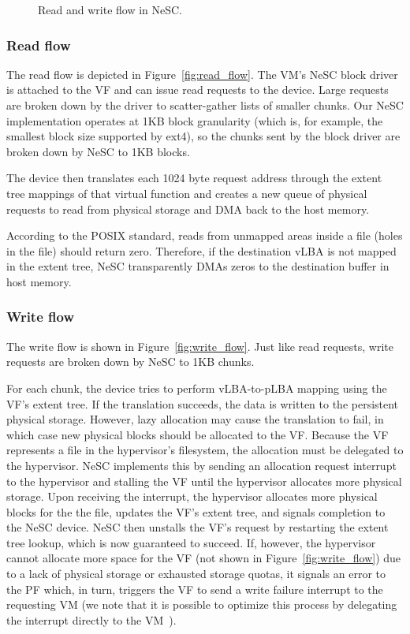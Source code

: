 \begin{figure}[t]
{%
    \label{fig:write_flow}
  }
  \caption{Read and write flow in NeSC.\label{fig:flow}}
\end{figure}

\subsubsection*{Read flow}
The read flow is depicted in Figure~\ref{fig:read_flow}. The VM's NeSC block driver is attached to the VF and can issue read requests to the device. Large requests are broken down by the driver to scatter-gather lists of smaller chunks. Our NeSC implementation operates at 1KB block granularity (which is, for example, the smallest block size supported by ext4), so the chunks sent by the block driver are broken down by NeSC to 1KB blocks.

The device then translates each 1024 byte request address through the extent tree mappings of that virtual function and creates a new queue of physical requests to read from physical storage and DMA back to the host memory.

According to the POSIX standard, reads from unmapped areas inside a file (holes in the file) should return zero. Therefore, if the destination vLBA is not mapped in the extent tree, NeSC transparently DMAs zeros to the destination buffer in host memory.

\subsubsection*{Write flow}

The write flow is shown in Figure~\ref{fig:write_flow}. Just like read requests, write requests are broken down by NeSC to 1KB chunks.

For each chunk, the device tries to perform vLBA-to-pLBA mapping using the VF's extent tree. If the translation succeeds, the data is written to the persistent physical storage.
However, lazy allocation may cause  the translation to fail, in which case new physical blocks should be allocated to the VF. Because the VF represents a file in the hypervisor's filesystem, the allocation must be delegated to the hypervisor. NeSC implements this by sending an allocation request interrupt to the hypervisor and stalling the VF until the hypervisor allocates more physical storage.
%
Upon receiving the interrupt, the hypervisor allocates more physical blocks for the the file, updates the VF's extent tree, and signals completion to the NeSC device. NeSC then unstalls the VF's request by restarting the extent tree lookup, which is now guaranteed to succeed. If, however, the hypervisor cannot allocate more space for the VF (not shown in Figure~\ref{fig:write_flow}) due to a lack of physical storage or exhausted storage quotas, it signals an error to the PF which, in turn, triggers the VF to send a write failure interrupt to the requesting VM (we note that it is possible to optimize this process by delegating the interrupt directly to the VM~\cite{gordon12eli}).

